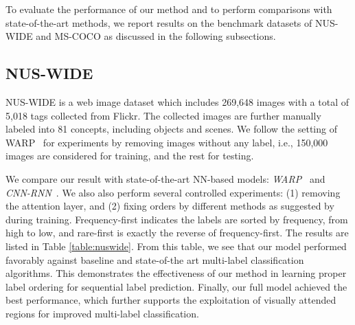 \documentclass[letterpaper]{article} %
\begin{document}
To evaluate the performance of our method and to perform comparisons with state-of-the-art methods, we report results on the benchmark datasets of NUS-WIDE and MS-COCO as discussed in the following subsections.\\
\subsection{NUS-WIDE}

NUS-WIDE is a web image dataset which includes 269,648 images with a total of 5,018 tags collected from Flickr. The collected images are further manually labeled into 81 concepts, including objects and scenes. We follow the setting of WARP~\cite{gong2013deep} for experiments by removing images without any label, i.e., 150,000 images are considered for training, and the rest for testing.

We compare our result with state-of-the-art NN-based models: \textit{WARP}~\cite{gong2013deep} and \textit{CNN-RNN}~\cite{wang2016cnn}. We also also perform several controlled experiments: (1) removing the attention layer, and (2) fixing orders by different methods as suggested by~\cite{jin2016annotation} during training. Frequency-first indicates the labels are sorted by frequency, from high to low, and rare-first is exactly the reverse of frequency-first. The results are listed in Table \ref{table:nuswide}. From this table, we see that our model performed favorably against baseline and state-of-the art multi-label classification algorithms. This demonstrates the effectiveness of our method in learning proper label ordering for sequential label prediction. Finally, our full model achieved the best performance, which further supports the exploitation of visually attended regions for improved multi-label classification.
\end{document}
